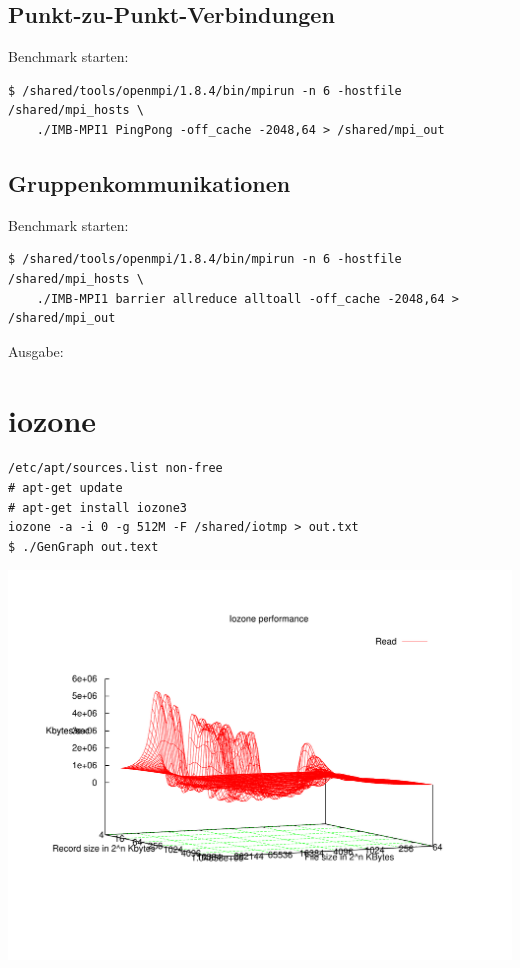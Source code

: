 \subsection{Punkt-zu-Punkt-Verbindungen}
Benchmark starten:
\begin{lstlisting}[style=Bash]
$ /shared/tools/openmpi/1.8.4/bin/mpirun -n 6 -hostfile /shared/mpi_hosts \
	./IMB-MPI1 PingPong -off_cache -2048,64 > /shared/mpi_out
\end{lstlisting}
\subsection{Gruppenkommunikationen}
Benchmark starten:
\begin{lstlisting}[style=Bash]
$ /shared/tools/openmpi/1.8.4/bin/mpirun -n 6 -hostfile /shared/mpi_hosts \
	./IMB-MPI1 barrier allreduce alltoall -off_cache -2048,64 > /shared/mpi_out
\end{lstlisting}
Ausgabe:

\section{iozone}
\begin{lstlisting}[style=Bash]
/etc/apt/sources.list non-free
# apt-get update
# apt-get install iozone3
iozone -a -i 0 -g 512M -F /shared/iotmp > out.txt
$ ./GenGraph out.text
\end{lstlisting}
\includegraphics[scale=0.7]{read.pdf}
